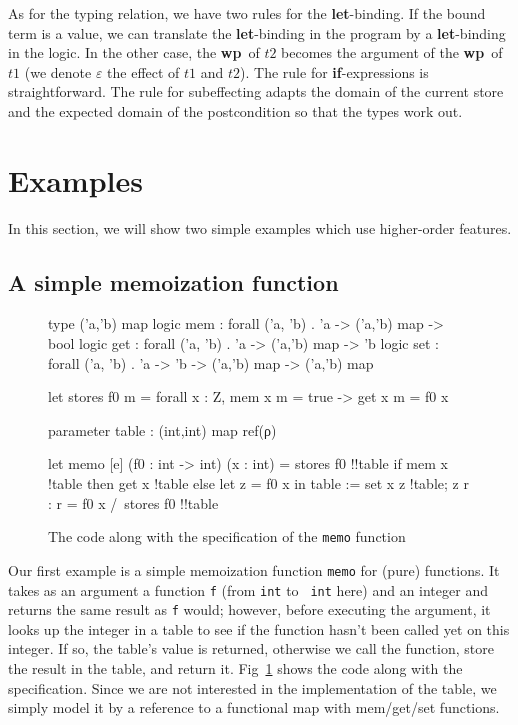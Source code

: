 \documentclass[a4paper]{llncs}
\newcommand{\wpre}{{\bf wp}}
\newcommand{\letml}{{\bf let}}
\newcommand{\ifml}{{\bf if}}
\begin{document}
As for the typing relation, we have two rules for the \letml-binding. If the
bound term is a value, we can translate the \letml-binding in the program by a
\letml-binding in the logic. In the other case, the \wpre\ of $ t2 $ becomes
the argument of the \wpre\ of $ t1 $ (we denote $ε$ the effect of $ t1 $ and $
t2 $). The rule for \ifml-expressions is straightforward. The rule for
subeffecting adapts the domain of the current store and the expected domain of
the postcondition so that the types work out.

\section{Examples}
\label{sec:examples}

In this section, we will show two simple examples which use higher-order
features.

\subsection{A simple memoization function}

\begin{figure}[tpb]
\begin{who}
type ('a,'b) map
logic mem : forall ('a, 'b) . 'a -> ('a,'b) map -> bool
logic get : forall ('a, 'b) . 'a -> ('a,'b) map -> 'b
logic set : forall ('a, 'b) . 'a -> 'b -> ('a,'b) map -> ('a,'b) map

let stores f0 m =
  forall x : Z, mem x m = true -> get x m = f0 x

parameter table : (int,int) map ref(ρ)

let memo [e] (f0 : int -> int) (x : int) = 
  {stores f0 !!table}
  if mem x !table then get x !table
  else
    let z = f0 x in
    table := set x z !table;
    z
  {r : r = f0 x /\ stores f0 !!table}
\end{who}
  \caption{The code along with the specification of the {\tt memo} function}
  \label{fig:memo}
\end{figure}

Our first example is a simple memoization function {\tt memo} for (pure)
functions.  It takes as an argument a function {\tt f} (from {\tt int} to {\tt
int} here) and an integer and returns the same result as {\tt f} would;
however, before executing the argument, it looks up the integer in a table to
see if the function hasn't been called yet on this integer. If so, the table's
value is returned, otherwise we call the function, store the result in the
table, and return it. Fig~\ref{fig:memo} shows the code along with the
specification. Since we are not interested in the implementation of the table,
we simply model it by a reference to a functional map with mem/get/set functions.
\end{document}
